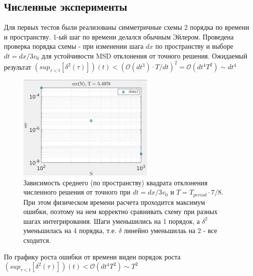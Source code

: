 \documentclass[a4paper,12pt]{article} %
\begin{document}
\subsection{Численные эксперименты}

Для первых тестов были реализованы симметричные схемы 2 порядка по времени и пространству. 1-ый шаг по времени делался обычным Эйлером. Проведена проверка порядка схемы - при изменении шага $dx$ по пространству и выборе $dt = dx/3v_0$ для устойчивости MSD отклонения от точного решения. Ожидаемый результат $(sup_{\tau < t}[\delta^2(\tau)])(t) < (\mathcal{O}(dt^3) \cdot T/dt)^2 = \mathcal{O}(dt^4 T^2) \sim dt^4$

\begin{figure}[h!]
\begin{center}
\includegraphics[width=0.6\textwidth]{./pics/Atype_nErr}
\end{center}
\caption{Зависимость среднего (по пространству) квадрата отклонения численного решения от точного при $dt = dx/3v_0$ и $T = T_{period} \cdot 7/8$. При этом физическом времени расчета проходится максимум ошибки, поэтому на нем корректно сравнивать схему при разных шагах интегрирования. Шаги уменьшились на 1 порядок, а $\delta^2$ уменьшилась на 4 порядка, т.е. $\delta$ линейно уменьшилаь на 2 - все сходится.} \label{img:Atype_nErr}
\end{figure}

\newpage

По графику роста ошибки от времени виден порядок роста $(sup_{\tau < t}[\delta^2(\tau)])(t) < \mathcal{O}(dt^4 T^2) \sim T^2$
\end{document}
